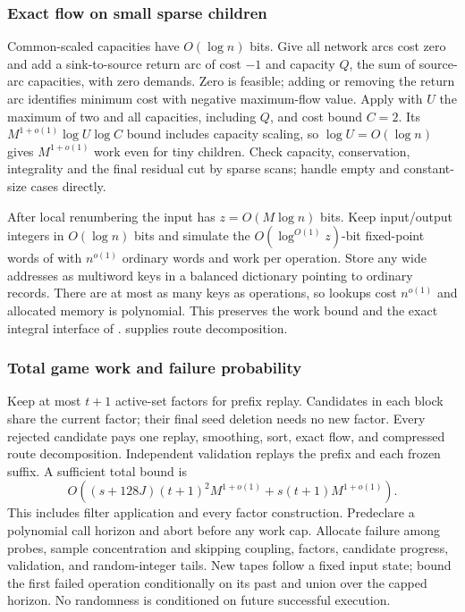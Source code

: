 \documentclass[11pt]{article}
\theoremstyle{remark}
\begin{document}
\subsubsection{Exact flow on small sparse children} Common-scaled capacities
have $O(\log n)$ bits.
Give all network arcs cost zero and add a sink-to-source return arc of cost $-1$
and capacity $Q$, the sum of source-arc capacities, with zero demands.
Zero is feasible; adding or removing the return arc identifies minimum cost with
negative maximum-flow value.
Apply \cite[Theorem~1.1]{BCPKLPSS23:conf} with $U$ the maximum of two and all
capacities, including $Q$, and cost bound $C=2$.
Its $M^{1+o(1)}\log U\log C$ bound includes capacity scaling, so $\log U=O(\log n)$
gives $M^{1+o(1)}$ work even for tiny children.
Check capacity, conservation, integrality and the final residual cut by sparse
scans; handle empty and constant-size cases directly.

After local renumbering the input has $z=O(M\log n)$ bits.
Keep input/output integers in $O(\log n)$ bits and simulate the $O(\log^{O(1)}z)$-bit
fixed-point words of \cite[Section~2]{BCPKLPSS23:conf} with $n^{o(1)}$ ordinary
words and work per operation.
Store any wide addresses as multiword keys in a balanced dictionary pointing to
ordinary records.
There are at most as many keys as operations, so lookups cost $n^{o(1)}$ and
allocated memory is polynomial.
This preserves the work bound and the exact integral interface of
\cite[Theorem~1.1 and Lemma~4.1]{BCPKLPSS23:conf}.
 supplies route decomposition.

\subsubsection{Total game work and failure probability} Keep at most $t+1$
active-set factors for prefix replay.
Candidates in each block share the current factor; their final seed deletion
needs no new factor.
Every rejected candidate pays one replay, smoothing, sort, exact flow, and
compressed route decomposition.
Independent validation replays the prefix and each frozen suffix.
A sufficient total bound is
\begin{equation}\label{struct27:eq:gamework}
 O((s+128J)(t+1)^2M^{1+o(1)}
       +s(t+1)M^{1+o(1)}).
\end{equation}
This includes filter application and every factor construction.
Predeclare a polynomial call horizon and abort before any work cap.
Allocate failure among probes, sample concentration and skipping coupling,
factors, candidate progress, validation, and random-integer tails.
New tapes follow a fixed input state; bound the first failed operation
conditionally on its past and union over the capped horizon.
No randomness is conditioned on future successful execution.
\end{document}
